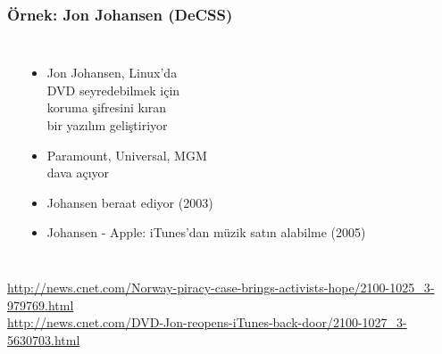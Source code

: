 \documentclass[dvipsnames]{beamer}
\theoremstyle{definition}
\theoremstyle{example}
\theoremstyle{plain}
\begin{document}
\begin{frame}
  \frametitle{Örnek: Jon Johansen (DeCSS)}

  \begin{columns}
    \begin{center}
    \end{center}

    \begin{itemize}
      \item Jon Johansen, Linux'da\\
        DVD seyredebilmek için\\
        koruma şifresini kıran\\
        bir yazılım geliştiriyor
      \item Paramount, Universal, MGM\\
        dava açıyor
      \item Johansen beraat ediyor (2003)

      \pause
      \medskip
      \item Johansen - Apple: iTunes'dan müzik satın alabilme (2005)
    \end{itemize}
  \end{columns}

  \medskip
  \tiny{\url{http://news.cnet.com/Norway-piracy-case-brings-activists-hope/2100-1025_3-979769.html}}\\
  \tiny{\url{http://news.cnet.com/DVD-Jon-reopens-iTunes-back-door/2100-1027_3-5630703.html}}\\
\end{frame}
\end{document}
